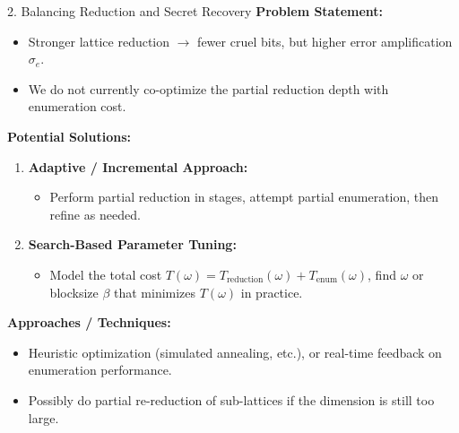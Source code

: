 \documentclass{beamer}
\begin{document}
\begin{frame}{2. Balancing Reduction and Secret Recovery}
  \textbf{Problem Statement:}
  \begin{itemize}
    \item Stronger lattice reduction $\rightarrow$ fewer cruel bits, but higher error amplification $\sigma_e$.
    \item We do not currently co-optimize the partial reduction depth with enumeration cost.
  \end{itemize}
  
  \textbf{Potential Solutions:}
  \begin{enumerate}
    \item \textbf{Adaptive / Incremental Approach:}
      \begin{itemize}
        \item Perform partial reduction in stages, attempt partial enumeration, then refine as needed.
      \end{itemize}
    \item \textbf{Search-Based Parameter Tuning:}
      \begin{itemize}
        \item Model the total cost $T(\omega) = T_{\mathrm{reduction}}(\omega) + T_{\mathrm{enum}}(\omega)$,
              find $\omega$ or blocksize $\beta$ that minimizes $T(\omega)$ in practice.
      \end{itemize}
  \end{enumerate}

  \textbf{Approaches / Techniques:}
  \begin{itemize}
    \item Heuristic optimization (simulated annealing, etc.), or real-time feedback on enumeration performance.
    \item Possibly do partial re-reduction of sub-lattices if the dimension is still too large.
  \end{itemize}
\end{frame}
\end{document}
